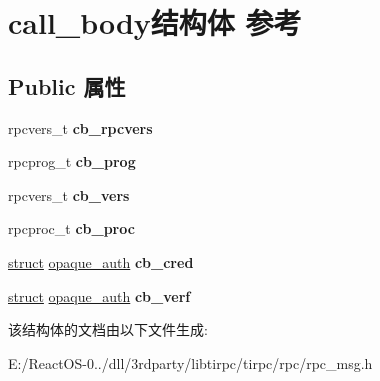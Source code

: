 \hypertarget{structcall__body}{}\section{call\+\_\+body结构体 参考}
\label{structcall__body}
\subsection*{Public 属性}
\begin{DoxyCompactItemize}
\item 
\mbox{\label{structcall__body_ad9c65a581ae73ad362365a7aa1b37b99}} 
rpcvers\+\_\+t {\bfseries cb\+\_\+rpcvers}
\item 
\mbox{\label{structcall__body_a30e481d9314fe1347c1a4bff375241f1}} 
rpcprog\+\_\+t {\bfseries cb\+\_\+prog}
\item 
\mbox{\label{structcall__body_a56c8ddf270f5f4a2886fe04fb4e25e08}} 
rpcvers\+\_\+t {\bfseries cb\+\_\+vers}
\item 
\mbox{\label{structcall__body_aad2ac328d8c3a7521538ad4afcaed318}} 
rpcproc\+\_\+t {\bfseries cb\+\_\+proc}
\item 
\mbox{\label{structcall__body_ac5413dc8e30cdc6ff86ddedf919db85b}} 
\hyperlink{interfacestruct}{struct} \hyperlink{structopaque__auth}{opaque\+\_\+auth} {\bfseries cb\+\_\+cred}
\item 
\mbox{\label{structcall__body_aa69128a25ceb986e9f07ac5fed40edf9}} 
\hyperlink{interfacestruct}{struct} \hyperlink{structopaque__auth}{opaque\+\_\+auth} {\bfseries cb\+\_\+verf}
\end{DoxyCompactItemize}


该结构体的文档由以下文件生成\+:\begin{DoxyCompactItemize}
\item 
E\+:/\+React\+O\+S-\/0../dll/3rdparty/libtirpc/tirpc/rpc/rpc\+\_\+msg.\+h\end{DoxyCompactItemize}
